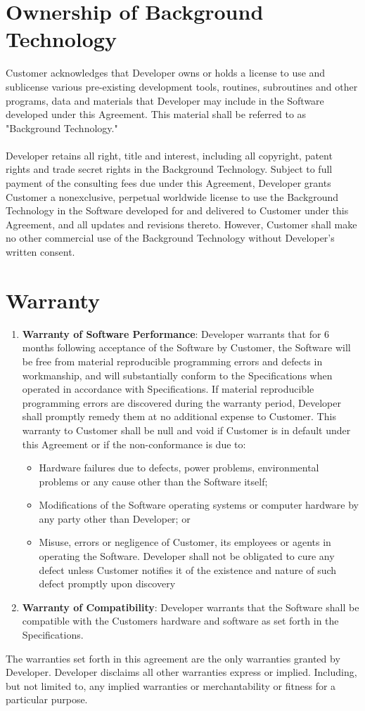 \documentclass[11pt]{article}
\begin{document}
\section{Ownership of Background Technology}
Customer acknowledges that Developer owns or holds a license to use and sublicense various pre-existing development tools, routines, subroutines and other programs, data and materials that Developer may include in the Software developed under this Agreement. This material shall be referred to as "Background Technology."  \\\\
Developer retains all right, title and interest, including all copyright, patent rights and trade secret rights in the Background Technology. Subject to full payment of the consulting fees due under this Agreement, Developer grants Customer a nonexclusive, perpetual worldwide license to use the Background Technology in the Software developed for and delivered to Customer under this Agreement, and all updates and revisions thereto. However, Customer shall make no other commercial use of the Background Technology without Developer’s written consent.
\section{Warranty}
\begin{enumerate}
\renewcommand{\labelenumi}{(\Alph{enumi})}
\item {\bf Warranty of Software Performance}: Developer warrants that for 6 months following acceptance of the Software by Customer, the Software will be free from material reproducible programming errors and defects in workmanship, and will substantially conform to the Specifications when operated in accordance with Specifications. If material reproducible programming errors are discovered during the warranty period, Developer shall promptly remedy them at no additional expense to Customer. This warranty to Customer shall be null and void if Customer is in default under this Agreement or if the non-conformance is due to:
\begin{itemize}
\item Hardware failures due to defects, power problems, environmental problems or any cause other than the Software itself;
\item Modifications of the Software operating systems or computer hardware by any party other than Developer; or
\item Misuse, errors or negligence of Customer, its employees or agents in operating the Software. Developer shall not be obligated to cure any defect unless Customer notifies it of the existence and nature of such defect promptly upon discovery
\end{itemize}
\item {\bf  Warranty of Compatibility}: Developer warrants that the Software shall be compatible with the Customers hardware and software as set forth in the Specifications. 
\end{enumerate}
The warranties set forth in this agreement are the only warranties granted by Developer. Developer disclaims all other warranties express or implied. Including, but not limited to, any implied warranties or merchantability or fitness for a particular purpose.
\end{document}
